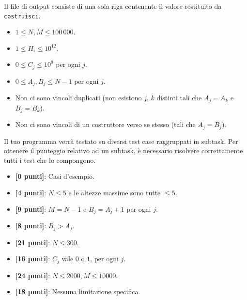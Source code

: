 Il file di output consiste di una sola riga contenente il valore restituito da
\texttt{costruisci}.



\Constraints

\begin{itemize}[nolistsep, itemsep=2mm]
	\item $1 \le N, M \le 100\,000$.
	\item $1 \le H_i \le 10^{12}$.
	\item $0 \leq C_j \le 10^9$ per ogni $j$.
	\item $0 \leq A_j, B_j \leq N - 1$ per ogni $j$.
	\item Non ci sono vincoli duplicati (non esistono $j$, $k$ distinti tali che
	      $A_j = A_k$ e $B_j = B_k$).
	\item Non ci sono vincoli di un costruttore verso se stesso (tali che $A_j =
	      B_j$).
\end{itemize}



\Scoring

Il tuo programma verrà testato su diversi test case raggruppati in subtask.
Per ottenere il punteggio relativo ad un subtask, è necessario risolvere correttamente tutti i test che lo compongono.

\begin{itemize}[nolistsep,itemsep=2mm]
  \item \textbf{ [\phantom{1}0 punti]}: Casi d'esempio.
  \item \textbf{ [\phantom{1}4 punti]}: $N \leq 5$ e le altezze massime sono tutte $\leq 5$.
  \item \textbf{ [\phantom{1}9 punti]}: $M = N - 1$ e $B_j = A_j + 1$ per ogni $j$.
  \item \textbf{ [\phantom{1}8 punti]}: $B_j > A_j$.
  \item \textbf{ [21 punti]}: $N \leq 300$.
  \item \textbf{ [16 punti]}: $C_j$ vale $0$ o $1$, per ogni $j$.
  \item \textbf{ [24 punti]}: $N \leq 2000, M \leq 10000$.
  \item \textbf{ [18 punti]}: Nessuna limitazione specifica.
\end{itemize}

